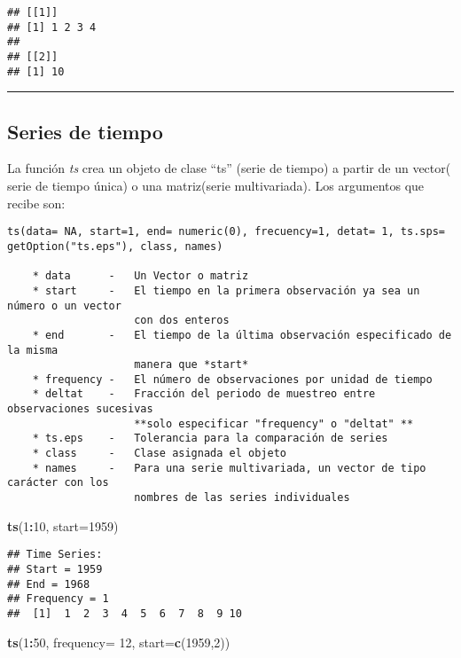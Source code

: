 \documentclass[11pt,]{article}
\newenvironment{Shaded}{\begin{snugshade}}{\end{snugshade}}
\newcommand{\DataTypeTok}[1]{\textcolor[rgb]{0.13,0.29,0.53}{#1}}
\newcommand{\DecValTok}[1]{\textcolor[rgb]{0.00,0.00,0.81}{#1}}
\newcommand{\KeywordTok}[1]{\textcolor[rgb]{0.13,0.29,0.53}{\textbf{#1}}}
\newcommand{\NormalTok}[1]{#1}
\newcommand{\OperatorTok}[1]{\textcolor[rgb]{0.81,0.36,0.00}{\textbf{#1}}}
\begin{document}
\begin{verbatim}
## [[1]]
## [1] 1 2 3 4
## 
## [[2]]
## [1] 10
\end{verbatim}

\begin{center}\rule{0.5\linewidth}{0.5pt}\end{center}

\hypertarget{series-de-tiempo}{%
\subsection{Series de tiempo}\label{series-de-tiempo}}

La función \emph{ts} crea un objeto de clase ``ts'' (serie de tiempo) a
partir de un vector( serie de tiempo única) o una matriz(serie
multivariada). Los argumentos que recibe son:

\begin{verbatim}
ts(data= NA, start=1, end= numeric(0), frecuency=1, detat= 1, ts.sps= 
getOption("ts.eps"), class, names)

    * data      -   Un Vector o matriz
    * start     -   El tiempo en la primera observación ya sea un número o un vector
                    con dos enteros
    * end       -   El tiempo de la última observación especificado de la misma 
                    manera que *start*
    * frequency -   El número de observaciones por unidad de tiempo
    * deltat    -   Fracción del periodo de muestreo entre observaciones sucesivas 
                    **solo especificar "frequency" o "deltat" **   
    * ts.eps    -   Tolerancia para la comparación de series
    * class     -   Clase asignada el objeto
    * names     -   Para una serie multivariada, un vector de tipo carácter con los
                    nombres de las series individuales
\end{verbatim}

\begin{Shaded}
\begin{Highlighting}[]
\KeywordTok{ts}\NormalTok{(}\DecValTok{1}\OperatorTok{:}\DecValTok{10}\NormalTok{, }\DataTypeTok{start=}\DecValTok{1959}\NormalTok{)}
\end{Highlighting}
\end{Shaded}

\begin{verbatim}
## Time Series:
## Start = 1959 
## End = 1968 
## Frequency = 1 
##  [1]  1  2  3  4  5  6  7  8  9 10
\end{verbatim}

\begin{Shaded}
\begin{Highlighting}[]
\KeywordTok{ts}\NormalTok{(}\DecValTok{1}\OperatorTok{:}\DecValTok{50}\NormalTok{, }\DataTypeTok{frequency=} \DecValTok{12}\NormalTok{, }\DataTypeTok{start=}\KeywordTok{c}\NormalTok{(}\DecValTok{1959}\NormalTok{,}\DecValTok{2}\NormalTok{))}
\end{Highlighting}
\end{Shaded}
\end{document}
